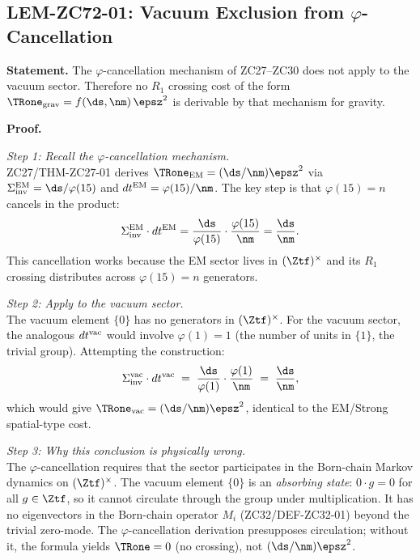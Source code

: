 \documentclass[12pt, a4paper]{article}
\begin{document}
\subsection{LEM-ZC72-01: Vacuum Exclusion from $\varphi$-Cancellation}
\label{sec:lem01}


\begin{formalbox}[title={LEM-ZC72-01: No Born-Chain $R_1$ Crossing Cost
  for the Vacuum Sector ($R_0$, Exact)}]

\textbf{Statement.}
The $\varphi$-cancellation mechanism of ZC27--ZC30 does not
apply to the vacuum sector.
Therefore no $R_1$ crossing cost of the form
$\TRone_{\rm grav} = f(\ds, \nm)\,\epsz^2$ is derivable
by that mechanism for gravity.

\textbf{Proof.}

\textit{Step 1: Recall the $\varphi$-cancellation mechanism.}\\
ZC27/THM-ZC27-01 derives $\TRone_{\rm EM} = (\ds/\nm)\epsz^2$
via $\Sigma_{\rm inv}^{\rm EM} = \ds/\varphi(15)$ and
$dt^{\rm EM} = \varphi(15)/\nm$.
The key step is that $\varphi(15) = n$ cancels in the product:
\[
  \Sigma_{\rm inv}^{\rm EM}\cdot dt^{\rm EM}
  = \frac{\ds}{\varphi(15)}\cdot\frac{\varphi(15)}{\nm}
  = \frac{\ds}{\nm}.
\]
This cancellation works because the EM sector lives in
$(\Ztf)^\times$ and its $R_1$ crossing distributes
across $\varphi(15) = n$ generators.

\textit{Step 2: Apply to the vacuum sector.}\\
The vacuum element $\{0\}$ has no generators in $(\Ztf)^\times$.
For the vacuum sector, the analogous $dt^{\rm vac}$ would involve
$\varphi(1) = 1$ (the number of units in $\{1\}$, the trivial group).
Attempting the construction:
\[
  \Sigma_{\rm inv}^{\rm vac}\cdot dt^{\rm vac}
  \;=\;
  \frac{\ds}{\varphi(1)}\cdot\frac{\varphi(1)}{\nm}
  \;=\;
  \frac{\ds}{\nm},
\]
which would give $\TRone_{\rm vac} = (\ds/\nm)\epsz^2$,
identical to the EM/Strong spatial-type cost.

\textit{Step 3: Why this conclusion is physically wrong.}\\
The $\varphi$-cancellation requires that the sector
participates in the Born-chain Markov dynamics on $(\Ztf)^\times$.
The vacuum element $\{0\}$ is an \emph{absorbing state}:
$0 \cdot g = 0$ for all $g \in \Ztf$, so it cannot circulate
through the group under multiplication.
It has no eigenvectors in the Born-chain operator $M_i$
(ZC32/DEF-ZC32-01) beyond the trivial zero-mode.
The $\varphi$-cancellation derivation presupposes circulation;
without it, the formula yields $\TRone = 0$ (no crossing),
not $(\ds/\nm)\epsz^2$.


\end{formalbox}
\end{document}
